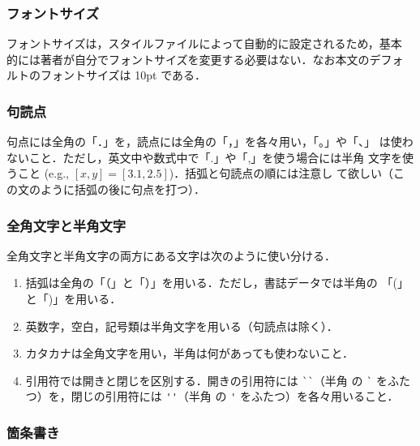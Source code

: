 \documentclass[a4j]{matsushita-zemi}
\begin{document}
\subsubsection{フォントサイズ}

フォントサイズは，スタイルファイルによって自動的に設定されるため，基本
的には著者が自分でフォントサイズを変更する必要はない．なお本文のデフォ
ルトのフォントサイズは 10pt である．


\subsubsection{句読点}

句点には全角の「．」を，読点には全角の「，」を各々用い，「。」や「、」
は使わないこと．ただし，英文中や数式中で「.」や「,」を使う場合には半角
文字を使うこと (e.g., $[x, y]=[3.1, 2.5]$)．括弧と句読点の順には注意し
て欲しい（この文のように括弧の後に句点を打つ）．

\subsubsection{全角文字と半角文字}

全角文字と半角文字の両方にある文字は次のように使い分ける．

\begin{enumerate}
\item 括弧は全角の「（」と「）」を用いる．ただし，書誌データでは半角の
  「(」と「)」を用いる．

\item 英数字，空白，記号類は半角文字を用いる（句読点は除く）．

\item カタカナは全角文字を用い，半角は何があっても使わないこと．

\item 引用符では開きと閉じを区別する．開きの引用符には \verb|``|（半角
  の \verb|`| をふたつ）を，閉じの引用符には \verb|''|（半角
  の \verb|'| をふたつ）を各々用いること．
\end{enumerate}

\subsubsection{箇条書き}
\end{document}
